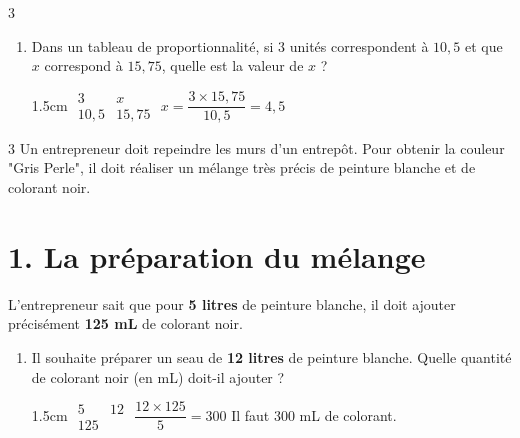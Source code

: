 \documentclass[a4paper]{book}
\begin{document}
{\begin{exerciceNote}{3}
\begin{enumerate}[leftmargin=*]
            \begin{ZoneReponse}{1.5cm}  
                $\begin{array}{c|c}
                     100 &  \\ \hline
                     92 & 250 
                \end{array}$ \quad 
                $\dfrac{250\times100}{92}\simeq 271,74$
            \end{ZoneReponse}

            \item Dans un tableau de proportionnalité, si $3$ unités correspondent à $10,5$ et que $x$ correspond à $15,75$, quelle est la valeur de $x$ ?

            \begin{ZoneReponse}{1.5cm}   
                $\begin{array}{c|c}
                     3 & x \\ \hline
                     10,5 & 15,75
                \end{array}$ \quad 
                $x=\dfrac{3\times15,75}{10,5}=4,5$
            \end{ZoneReponse}

        \end{enumerate}
    \end{exerciceNote}


    \begin{exerciceNote}{3}
        Un entrepreneur doit repeindre les murs d'un entrepôt. Pour obtenir la couleur "Gris Perle", il doit réaliser un mélange très précis de peinture blanche et de colorant noir.

        \section*{1. La préparation du mélange}
        L'entrepreneur sait que pour \textbf{5 litres} de peinture blanche, il doit ajouter précisément \textbf{125 mL} de colorant noir.
        
        
        \begin{enumerate}[leftmargin=*]
            \item Il souhaite préparer un seau de \textbf{12 litres} de peinture blanche. Quelle quantité de colorant noir (en mL) doit-il ajouter ?
                        
            \begin{ZoneReponse}{1.5cm}     
                $\begin{array}{c|c}
                     5 & 12 \\ \hline
                     125 & 
                \end{array}$ 
                \quad $\dfrac{12\times125}{5}=300$
                \quad Il faut 300 mL de colorant.
            \end{ZoneReponse}
            

\end{enumerate}
\end{exerciceNote}}
\end{document}
